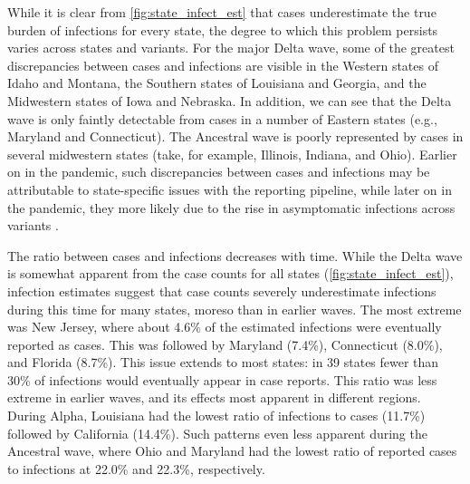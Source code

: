 While it is clear from \autoref{fig:state_infect_est} that cases underestimate
the true burden of infections for every state, the degree to which this problem
persists varies across states and variants. For the major Delta wave, some of
the greatest discrepancies between cases and infections are visible in the
Western states of Idaho and Montana, the Southern states of Louisiana and
Georgia, and the Midwestern states of Iowa and Nebraska. In addition, we can see
that the Delta wave is only faintly detectable from cases in a number of Eastern
states (e.g., Maryland and Connecticut). The Ancestral wave is poorly
represented  by cases in several
midwestern states (take, for example, Illinois, Indiana, and Ohio). Earlier on
in the pandemic, such discrepancies between cases and infections may be
attributable to state-specific issues with the reporting pipeline, while later
on in the pandemic, they more likely due to the rise in asymptomatic infections
across variants \citep{oph2022covid, garrett2022high}. 

The ratio between cases and infections decreases with time. While the Delta wave
is somewhat apparent from the case counts for all states
(\autoref{fig:state_infect_est}), infection estimates suggest that case counts
severely underestimate infections during this time for many states, moreso than
in earlier waves. The most extreme was New Jersey, where about 4.6\% of the
estimated infections were eventually reported as cases. This was followed by
Maryland (7.4\%), Connecticut (8.0\%), and Florida (8.7\%). This issue extends
to most states: in 39 states fewer than 30\% of infections would eventually
appear in case reports. This ratio was less extreme in earlier waves, and its
effects most apparent in different regions. During Alpha, Louisiana had the
lowest ratio of infections to cases (11.7\%) followed by California (14.4\%).
Such patterns even less apparent during the Ancestral wave, where Ohio and
Maryland had the lowest ratio of reported cases to infections at 22.0\%  and
22.3\%, respectively. 

